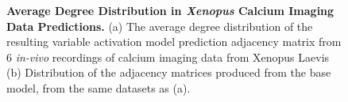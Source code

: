 \documentclass[11pt,titlepage]{article}
\begin{document}
\begin{figure}[H]
\begin{minipage}{0.49\linewidth}
\captionsetup{position=top}
\end{minipage}
\begin{minipage}{0.50\linewidth}
\captionsetup{position=top}
\end{minipage}
\caption[Average Degree Distribution in \textit{Xenopus} Calcium Imaging Data Predictions]{\textbf{Average Degree Distribution in \textit{Xenopus} Calcium Imaging Data Predictions.} (a) The average degree distribution of the resulting variable activation model prediction adjacency matrix from 6 \textit{in-vivo} recordings of calcium imaging data from {Xenopus Laevis} (b) Distribution of the adjacency matrices produced from the base model, from the same datasets as (a).}
\label{fig:DD2}
\end{figure}
\end{document}
